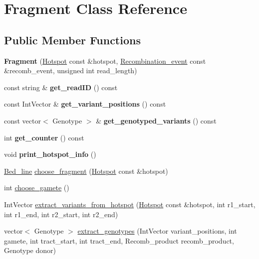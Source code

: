 \hypertarget{class_fragment}{}\section{Fragment Class Reference}
\label{class_fragment}
\subsection*{Public Member Functions}
\begin{DoxyCompactItemize}
\item 
\mbox{\label{class_fragment_aa7da512e587fa97a7654dcad2f52e01b}} 
{\bfseries Fragment} (\mbox{\hyperlink{class_hotspot}{Hotspot}} const \&hotspot, \mbox{\hyperlink{class_recombination__event}{Recombination\+\_\+event}} const \&recomb\+\_\+event, unsigned int read\+\_\+length)
\item 
\mbox{\label{class_fragment_a786e9b3d903c0769d8d5f5b0da57a06a}} 
const string \& {\bfseries get\+\_\+read\+ID} () const
\item 
\mbox{\label{class_fragment_a17a701443830dbe50a8444ed53010b4a}} 
const Int\+Vector \& {\bfseries get\+\_\+variant\+\_\+positions} () const
\item 
\mbox{\label{class_fragment_a6f567ebc663522ee42c79b108375f799}} 
const vector$<$ Genotype $>$ \& {\bfseries get\+\_\+genotyped\+\_\+variants} () const
\item 
\mbox{\label{class_fragment_a7a5609813ecff823a99e71641daa31c1}} 
int {\bfseries get\+\_\+counter} () const
\item 
\mbox{\label{class_fragment_a898778d4167a31eb55e28ac32e4f2121}} 
void {\bfseries print\+\_\+hotspot\+\_\+info} ()
\item 
\mbox{\hyperlink{struct_bed__line}{Bed\+\_\+line}} \mbox{\hyperlink{class_fragment_a0a7efd717d2eb453f380c261b43cd08d}{choose\+\_\+fragment}} (\mbox{\hyperlink{class_hotspot}{Hotspot}} const \&hotspot)
\item 
int \mbox{\hyperlink{class_fragment_af0b7207f40388ef97fe23bf05930ec59}{choose\+\_\+gamete}} ()
\item 
Int\+Vector \mbox{\hyperlink{class_fragment_afb77967eea24509b2a4a4907eb991f5b}{extract\+\_\+variants\+\_\+from\+\_\+hotspot}} (\mbox{\hyperlink{class_hotspot}{Hotspot}} const \&hotspot, int r1\+\_\+start, int r1\+\_\+end, int r2\+\_\+start, int r2\+\_\+end)
\item 
vector$<$ Genotype $>$ \mbox{\hyperlink{class_fragment_a377530f10a70d0c252bdb6bd4f8b5234}{extract\+\_\+genotypes}} (Int\+Vector variant\+\_\+positions, int gamete, int tract\+\_\+start, int tract\+\_\+end, Recomb\+\_\+product recomb\+\_\+product, Genotype donor)
\end{DoxyCompactItemize}
